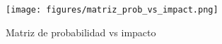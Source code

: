 \begin{figure}[H]
    \centering
    \texttt{[image: figures/matriz\_prob\_vs\_impact.png]}
    \caption{Matriz de probabilidad vs impacto}
    \label{fig:matriz_prob_vs_impact}
\end{figure}